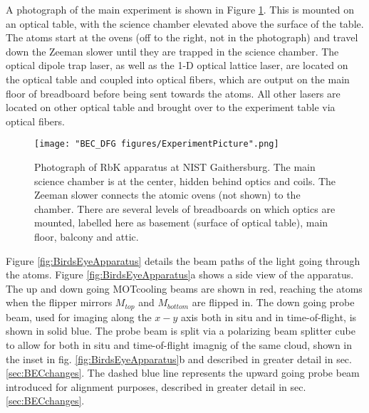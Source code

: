 A photograph of the main experiment is shown in Figure \ref{fig:ExperimentPicture}. This is mounted on an optical table, with the science chamber elevated above the surface of the table. The atoms start at the ovens (off to the right, not in the photograph) and travel down the Zeeman slower until they are trapped in the science chamber. The optical dipole trap laser, as well as the 1-D optical lattice laser, are located on the optical table and coupled into optical fibers, which are output on the main floor of breadboard before being sent towards the atoms. All other lasers are located on other optical table and brought over to the experiment table via optical fibers. 

\begin{figure}
	\texttt{[image: "BEC\_DFG figures/ExperimentPicture".png]}
\caption{Photograph of RbK apparatus at NIST Gaithersburg. The main science chamber is at the center, hidden behind optics and coils. The Zeeman slower connects the atomic ovens (not shown) to the chamber. There are several levels of breadboards on which optics are mounted, labelled here as basement (surface of optical table), main floor, balcony and attic.}
\label{fig:ExperimentPicture}
\end{figure}

Figure \ref{fig:BirdsEyeApparatus} details the beam paths of the light going through the atoms. Figure \ref{fig:BirdsEyeApparatus}a shows a side view of the apparatus. The up and down going MOTcooling beams are shown in red, reaching the atoms when the flipper mirrors $M_{top}$ and $M_{bottom}$ are flipped in. The down going probe beam, used for imaging along the $x-y$ axis both in situ and in time-of-flight, is shown in solid blue. The probe beam is split via a polarizing beam splitter cube to allow for both in situ and time-of-flight imagnig of the same cloud, shown in the inset in fig.  \ref{fig:BirdsEyeApparatus}b and described in greater detail in sec. \ref{sec:BECchanges}.  The dashed blue line represents the upward going probe beam introduced for alignment purposes, described in greater detail in sec. \ref{sec:BECchanges}. 

